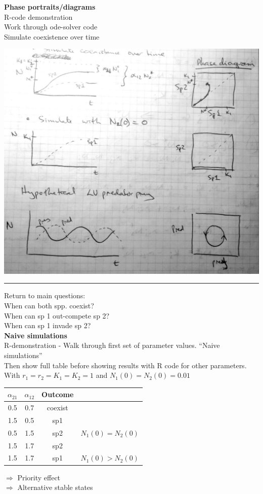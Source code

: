 \documentclass{article}
\newcommand{\note}[1]{\colorbox{gray!30}{#1}}
\newcommand{\ind}{\-\hspace{1cm}}
\begin{document}
\pagebreak
\textbf{Phase portraits/diagrams}\\
\note{R-code demonstration}\\
\ind \note{Work through ode-solver code}\\
\ind \note{Simulate coexistence over time}
\begin{center}
\includegraphics[width=15cm]{figs/PhasePortraits.pdf}
\end{center}

\rule[0.5ex]{\linewidth}{1pt}

Return to main questions:\\
\ind When can both spp. coexist?\\
\ind When can sp 1 out-compete sp 2?\\
\ind When can sp 1 invade sp 2?\\

\textbf{Naive simulations}\\
\ind \note{R-demonstration - Walk through first set of parameter values. ``Naive simulations''}\\
\ind \ind \note{Then show full table before showing results with R code for other parameters.}\\

\ind With $r_1 = r_2 = K_1 = K_2 = 1$ and $N_1(0) = N_2(0)=0.01$

\begin{table}[h]
\centering
\begin{tabular}{cccc}
$\alpha_{21}$ & $\alpha_{12}$ & Outcome \\ 
\hline
0.5 & 0.7 & coexist & \\
1.5 & 0.5 & sp1 & \\
0.5 & 1.5 & sp2 & $N_1(0)=N_2(0)$\\
1.5 & 1.7 & sp2 & \\
\hline
1.5 & 1.7 & sp1 & $N_1(0)>N_2(0)$\\
 \hline
\end{tabular} 
\end{table}
\ind \ind \ind \ind \ind \ind $\Rightarrow$ Priority effect\\
\ind \ind \ind \ind \ind \ind  $\Rightarrow$ Alternative stable states
\end{document}
